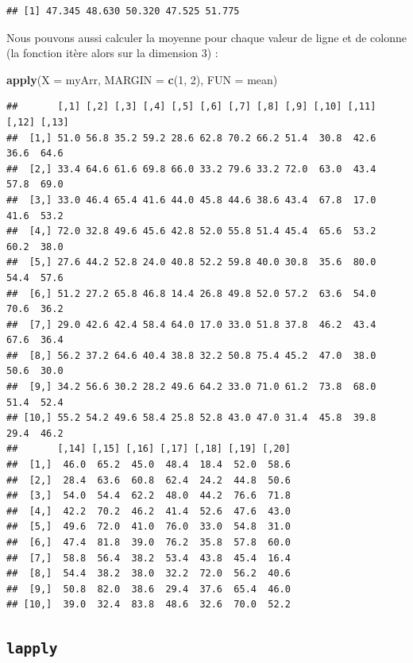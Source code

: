 \documentclass[]{book}
\newenvironment{Shaded}{\begin{snugshade}}{\end{snugshade}}
\newcommand{\DataTypeTok}[1]{\textcolor[rgb]{0.13,0.29,0.53}{#1}}
\newcommand{\DecValTok}[1]{\textcolor[rgb]{0.00,0.00,0.81}{#1}}
\newcommand{\KeywordTok}[1]{\textcolor[rgb]{0.13,0.29,0.53}{\textbf{#1}}}
\newcommand{\NormalTok}[1]{#1}
\begin{document}
\begin{verbatim}
## [1] 47.345 48.630 50.320 47.525 51.775
\end{verbatim}

Nous pouvons aussi calculer la moyenne pour chaque valeur de ligne et de colonne (la fonction itère alors sur la dimension 3) :

\begin{Shaded}
\begin{Highlighting}[]
\KeywordTok{apply}\NormalTok{(}\DataTypeTok{X =}\NormalTok{ myArr, }\DataTypeTok{MARGIN =} \KeywordTok{c}\NormalTok{(}\DecValTok{1}\NormalTok{, }\DecValTok{2}\NormalTok{), }\DataTypeTok{FUN =}\NormalTok{ mean)}
\end{Highlighting}
\end{Shaded}

\begin{verbatim}
##       [,1] [,2] [,3] [,4] [,5] [,6] [,7] [,8] [,9] [,10] [,11] [,12] [,13]
##  [1,] 51.0 56.8 35.2 59.2 28.6 62.8 70.2 66.2 51.4  30.8  42.6  36.6  64.6
##  [2,] 33.4 64.6 61.6 69.8 66.0 33.2 79.6 33.2 72.0  63.0  43.4  57.8  69.0
##  [3,] 33.0 46.4 65.4 41.6 44.0 45.8 44.6 38.6 43.4  67.8  17.0  41.6  53.2
##  [4,] 72.0 32.8 49.6 45.6 42.8 52.0 55.8 51.4 45.4  65.6  53.2  60.2  38.0
##  [5,] 27.6 44.2 52.8 24.0 40.8 52.2 59.8 40.0 30.8  35.6  80.0  54.4  57.6
##  [6,] 51.2 27.2 65.8 46.8 14.4 26.8 49.8 52.0 57.2  63.6  54.0  70.6  36.2
##  [7,] 29.0 42.6 42.4 58.4 64.0 17.0 33.0 51.8 37.8  46.2  43.4  67.6  36.4
##  [8,] 56.2 37.2 64.6 40.4 38.8 32.2 50.8 75.4 45.2  47.0  38.0  50.6  30.0
##  [9,] 34.2 56.6 30.2 28.2 49.6 64.2 33.0 71.0 61.2  73.8  68.0  51.4  52.4
## [10,] 55.2 54.2 49.6 58.4 25.8 52.8 43.0 47.0 31.4  45.8  39.8  29.4  46.2
##       [,14] [,15] [,16] [,17] [,18] [,19] [,20]
##  [1,]  46.0  65.2  45.0  48.4  18.4  52.0  58.6
##  [2,]  28.4  63.6  60.8  62.4  24.2  44.8  50.6
##  [3,]  54.0  54.4  62.2  48.0  44.2  76.6  71.8
##  [4,]  42.2  70.2  46.2  41.4  52.6  47.6  43.0
##  [5,]  49.6  72.0  41.0  76.0  33.0  54.8  31.0
##  [6,]  47.4  81.8  39.0  76.2  35.8  57.8  60.0
##  [7,]  58.8  56.4  38.2  53.4  43.8  45.4  16.4
##  [8,]  54.4  38.2  38.0  32.2  72.0  56.2  40.6
##  [9,]  50.8  82.0  38.6  29.4  37.6  65.4  46.0
## [10,]  39.0  32.4  83.8  48.6  32.6  70.0  52.2
\end{verbatim}

\hypertarget{l17sapply}{%
\subsection{\texorpdfstring{\texttt{lapply}}{lapply}}\label{l17sapply}}
\end{document}
